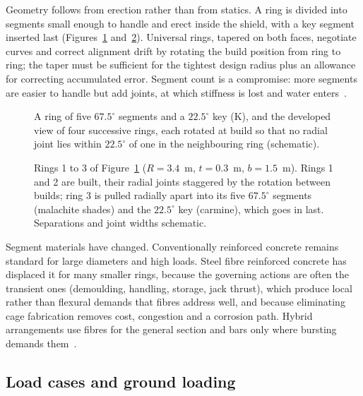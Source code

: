 Geometry follows from erection rather than from statics. A ring is divided into
segments small enough to handle and erect inside the shield, with a key segment
inserted last (Figures~\ref{fig:ring-build} and~\ref{fig:r3d-ring-build}). Universal rings, tapered on both faces, negotiate curves and
correct alignment drift by rotating the build position from ring to ring; the
taper must be sufficient for the tightest design radius plus an allowance for
correcting accumulated error. Segment count is a compromise: more segments are
easier to handle but add joints, at which stiffness is lost and
water enters~\citep{ita2019segmental}.

\begin{figure}[htbp]
\centering
{}
\caption{A ring of five $67.5^\circ$ segments and a $22.5^\circ$ key (K), and the developed view of four successive rings, each rotated at build so that no radial joint lies within $22.5^\circ$ of one in the neighbouring ring (schematic).}
\label{fig:ring-build}
\end{figure}

\begin{figure}[htbp]
\centering
{}
\caption{Rings 1 to 3 of Figure~\ref{fig:ring-build} ($R = 3.4$~m, $t = 0.3$~m, $b = 1.5$~m). Rings 1 and 2 are built, their radial joints staggered by the rotation between builds; ring 3 is pulled radially apart into its five $67.5^\circ$ segments (malachite shades) and the $22.5^\circ$ key (carmine), which goes in last. Separations and joint widths schematic.}
\label{fig:r3d-ring-build}
\end{figure}

Segment materials have changed. Conventionally reinforced concrete remains
standard for large diameters and high loads. Steel fibre reinforced concrete
has displaced it for many smaller rings, because the governing actions are
often the transient ones (demoulding, handling, storage, jack thrust),
which produce local rather than flexural demands that fibres address well, and
because eliminating cage fabrication removes cost, congestion and a corrosion
path. Hybrid arrangements use fibres for the general section and bars only
where bursting demands them~\citep{ita2019segmental}.

\subsection{Load cases and ground loading}
\label{sec:segment-loads}

